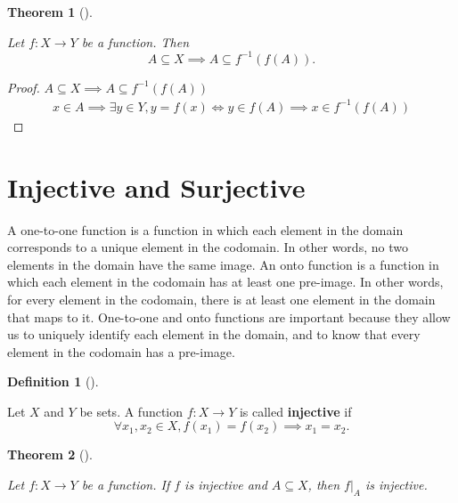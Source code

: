 \documentclass[
  letterpaper,
  10pt,
  reqno,
  twopage,
  openany]{book}
\theoremstyle{plain}
\theoremstyle{definition}
\theoremstyle{definition}
\newtheorem{definition}{Definition}[chapter]
\theoremstyle{definition}
\theoremstyle{plain}
\theoremstyle{plain}
\newtheorem{theorem}{Theorem}[chapter]
\theoremstyle{remark}
\begin{document}
\leavevmode{}%
\begin{theorem}[]\label{thm-subseteq-preimage}

Let \(f:X\to Y\) be a function. Then \[
A\subseteq X \implies A\subseteq f^{-1}(f(A)).
\]

\end{theorem}

\begin{proof}

\(A\subseteq X \implies A\subseteq f^{-1}(f(A))\) \begin{align*}
x\in A \implies \exists y\in Y, y=f(x) \Leftrightarrow y\in f(A) \implies x\in f^{-1}(f(A))
\end{align*}

\end{proof}

\hypertarget{injective-and-surjective}{%
\section{Injective and Surjective}\label{injective-and-surjective}}

A one-to-one function is a function in which each element in the domain
corresponds to a unique element in the codomain. In other words, no two
elements in the domain have the same image. An onto function is a
function in which each element in the codomain has at least one
pre-image. In other words, for every element in the codomain, there is
at least one element in the domain that maps to it. One-to-one and onto
functions are important because they allow us to uniquely identify each
element in the domain, and to know that every element in the codomain
has a pre-image.

\leavevmode{}%
\begin{definition}[]\label{def-injective-functions}

Let \(X\) and \(Y\) be sets. A function \(f:X\to Y\) is called
 \textbf{injective} if \[
\forall x_1,x_2\in X, f(x_1)=f(x_2)\implies x_1=x_2.
\]

\end{definition}

\leavevmode{}%
\begin{theorem}[]\label{thm-injective-restriction}

Let \(f:X\to Y\) be a function. If \(f\) is injective and
\(A\subseteq X\), then \(f|_A\) is injective.

\end{theorem}
\end{document}
